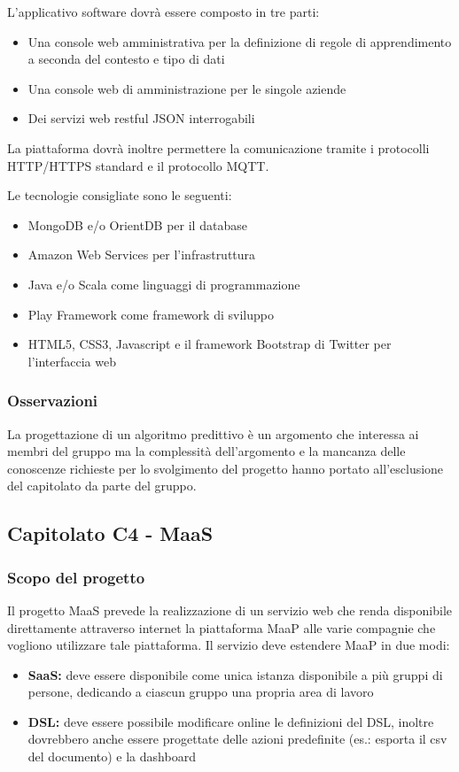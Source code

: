 L'applicativo software dovrà essere composto in tre parti:
\begin{itemize}
	\item Una console web amministrativa per la definizione di regole di apprendimento a seconda del contesto e tipo di dati
	\item Una console web di amministrazione per le singole aziende
	\item Dei servizi web restful JSON interrogabili
\end{itemize}
La piattaforma dovrà inoltre permettere la comunicazione tramite i protocolli HTTP/HTTPS standard e il protocollo MQTT.


Le tecnologie consigliate sono le seguenti:
\begin{itemize}
	\item MongoDB e/o OrientDB per il database
	\item Amazon Web Services per l'infrastruttura
	\item Java e/o Scala come linguaggi di programmazione
	\item Play Framework come framework di sviluppo
	\item HTML5, CSS3, Javascript e il framework Bootstrap di Twitter per l'interfaccia web
\end{itemize}

\subsubsection{Osservazioni}
La progettazione di un algoritmo predittivo è un argomento che interessa ai membri del gruppo ma la complessità dell'argomento e la mancanza delle conoscenze
richieste per lo svolgimento del progetto hanno portato all'esclusione del capitolato da parte del gruppo.



\subsection{Capitolato C4 - MaaS}
\subsubsection{Scopo del progetto}
Il progetto MaaS prevede la realizzazione di un servizio web che renda disponibile direttamente attraverso internet la piattaforma MaaP alle varie compagnie
che vogliono utilizzare tale piattaforma. Il servizio deve estendere MaaP in due modi:
\begin{itemize}
	\item \textbf{SaaS:} deve essere disponibile come unica istanza disponibile a più gruppi di persone, dedicando a ciascun gruppo una propria area di lavoro
	\item \textbf{DSL:} deve essere possibile modificare online le definizioni del DSL, inoltre dovrebbero anche essere progettate delle azioni predefinite (es.: esporta il csv del documento)
	e la dashboard
\end{itemize}

